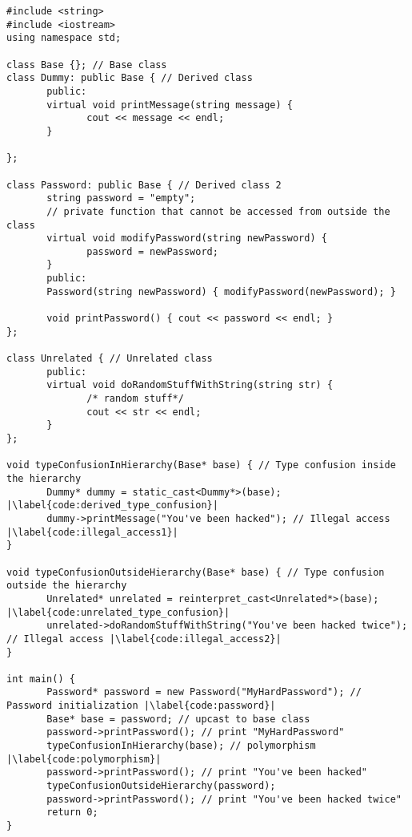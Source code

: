 \documentclass[a4paper,11pt,oneside]{report}
\begin{document}
\begin{listing}
       \begin{verbatim}
#include <string>
#include <iostream>
using namespace std;

class Base {}; // Base class
class Dummy: public Base { // Derived class
       public:
       virtual void printMessage(string message) {
              cout << message << endl;
       }
       
};

class Password: public Base { // Derived class 2
       string password = "empty";
       // private function that cannot be accessed from outside the class
       virtual void modifyPassword(string newPassword) {
              password = newPassword;
       }
       public:
       Password(string newPassword) { modifyPassword(newPassword); }

       void printPassword() { cout << password << endl; }
};

class Unrelated { // Unrelated class
       public: 
       virtual void doRandomStuffWithString(string str) {
              /* random stuff*/
              cout << str << endl;
       }
};

void typeConfusionInHierarchy(Base* base) { // Type confusion inside the hierarchy
       Dummy* dummy = static_cast<Dummy*>(base); |\label{code:derived_type_confusion}|
       dummy->printMessage("You've been hacked"); // Illegal access |\label{code:illegal_access1}|
}

void typeConfusionOutsideHierarchy(Base* base) { // Type confusion outside the hierarchy
       Unrelated* unrelated = reinterpret_cast<Unrelated*>(base); |\label{code:unrelated_type_confusion}|
       unrelated->doRandomStuffWithString("You've been hacked twice"); // Illegal access |\label{code:illegal_access2}|
}

int main() {
       Password* password = new Password("MyHardPassword"); // Password initialization |\label{code:password}|
       Base* base = password; // upcast to base class
       password->printPassword(); // print "MyHardPassword"
       typeConfusionInHierarchy(base); // polymorphism |\label{code:polymorphism}|
       password->printPassword(); // print "You've been hacked"
       typeConfusionOutsideHierarchy(password);
       password->printPassword(); // print "You've been hacked twice"
       return 0;
}
       \end{verbatim}
       \caption{Example of type confusion in C++ within the same class hierarchy}
       \label{lst:type_confusion}
\end{listing}
\end{document}

